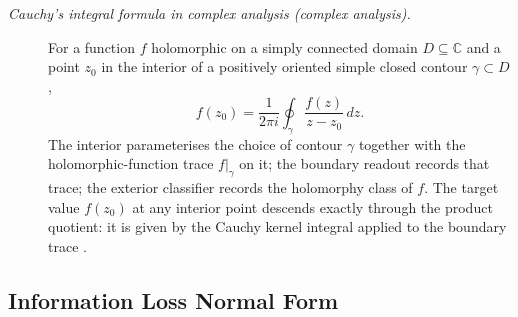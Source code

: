 \documentclass[11pt]{article}
\theoremstyle{definition}
\begin{document}
\begin{description}
\item[\emph{Cauchy's integral formula in complex analysis
(complex analysis).}]
For a function \(f\) holomorphic on a simply connected
domain \(D\subseteq\mathbb C\) and a point \(z_0\) in
the interior of a positively oriented simple closed
contour \(\gamma\subset D\),
\[
  f(z_0)=\frac{1}{2\pi i}\oint_\gamma \frac{f(z)}{z-z_0}\,
  dz.
\]
The interior parameterises the choice of contour
\(\gamma\) together with the holomorphic-function trace
\(f|_\gamma\) on it; the boundary readout records that
trace; the exterior classifier records the holomorphy
class of \(f\).  The target value \(f(z_0)\) at any
interior point descends exactly through the product
quotient: it is given by the Cauchy kernel integral
applied to the boundary trace
\citep{Ahlfors1979ComplexAnalysis}.
\end{description}

\subsection{Information Loss Normal Form}\label{sec:self-reference-limits:information-loss}
\end{document}
